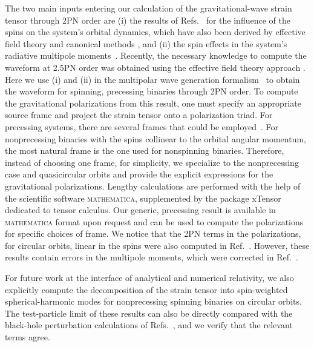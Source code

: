 \documentclass[aps, prd,
twocolumn,%
superscriptaddress,
showpacs, nofootinbib, eqsecnum, amsmath, amssymb, floatfix
]{revtex4}
\begin{document}
The two main inputs entering our calculation of the gravitational-wave strain
tensor through 2PN order are (i) the results of Refs.~\cite{Kidder:1995zr,
  Poisson:1997ha, Blanchet-Buonanno-Faye:2006} for the influence of the spins
on the system's orbital dynamics, which have also been derived by effective
field theory and canonical methods \cite{PortoRothstein2006,Porto:2008tb,
  Porto:2010tr,Damour:2007nc, Steinhoff08, Steinhoff08a, Steinhoff08b}, and (ii) the spin
effects in the system's radiative multipole
moments~\cite{Blanchet-Buonanno-Faye:2006}. Recently, the necessary knowledge
to compute the waveform at 2.5PN order was obtained using the effective field
theory approach \cite{Porto:2010tr,Porto:2012x}. Here we use (i) and (ii) in
the multipolar wave generation formalism~\cite{thorne80, Blanchet:1992br,
  Blanchet:1995fr} to obtain the waveform for spinning, precessing binaries
through 2PN order. To compute the gravitational polarizations from
this result, one must specify an appropriate source frame and
project the strain tensor onto a polarization triad. For precessing
systems, there are several frames that could be
employed~\cite{Finn1993, Kidder:1995zr, Buonanno:2002fy,
Schmidt:2010it,OShaughnessy2011, Ochsner2012,
2011PhRvD..84l4011B,Schmidt:2012rh}. For nonprecessing binaries with
the spins collinear to the orbital angular momentum, the most
natural frame is the one used for nonspinning binaries. Therefore,
instead of choosing one frame, for simplicity, we specialize to the
nonprecessing case and quasicircular orbits and provide the explicit
expressions for the gravitational polarizations. Lengthy
calculations are performed with the help of the scientific software
\textsc{mathematica}{\footnotesize \textregistered}, supplemented by
the package xTensor~\cite{xtensor} dedicated to tensor calculus. Our
generic, precessing result is available in \textsc{mathematica}
format upon request and can be used to compute the polarizations for
specific choices of frame. We notice that the 2PN terms in the
polarizations, for circular orbits, linear in the spins were also
computed in Ref.~\cite{1998PhRvD..57.6168O}. However, these results
contain errors in the multipole moments, which were corrected in
Ref.~\cite{Blanchet-Buonanno-Faye:2006}.

For future work at the interface of analytical and numerical
relativity, we also explicitly compute the decomposition of the
strain tensor into spin-weighted spherical-harmonic modes for
nonprecessing spinning binaries on circular orbits. The
test-particle limit of these results can also be directly compared
with the black-hole perturbation calculations of
Refs.~\cite{Tagoshi:1996gh,Pan2010hz}, and we verify that the
relevant terms agree.
\end{document}
